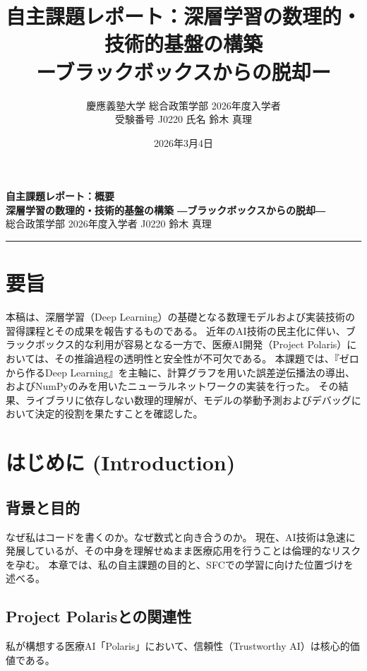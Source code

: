 \documentclass[uplatex, dvipdfmx, a4paper, 11pt]{jsarticle}
\title{自主課題レポート：深層学習の数理的・技術的基盤の構築\\ \large ーブラックボックスからの脱却ー}
\author{慶應義塾大学 総合政策学部 2026年度入学者\\ 受験番号 J0220 \quad 氏名 鈴木 真理}
\date{2026年3月4日}
\begin{document}
\begin{center}
    {\Large \textbf{自主課題レポート：概要}} \\[5mm]
    {\large \textbf{深層学習の数理的・技術的基盤の構築 ―ブラックボックスからの脱却―}} \\[5mm]
    {\large 総合政策学部 2026年度入学者 \quad J0220 \quad 鈴木 真理} \\[2mm]
    \rule{\textwidth}{0.4mm}
\end{center}

\thispagestyle{empty}

\section*{要旨}
本稿は、深層学習（Deep Learning）の基礎となる数理モデルおよび実装技術の習得課程とその成果を報告するものである。
近年のAI技術の民主化に伴い、ブラックボックス的な利用が容易となる一方で、医療AI開発（Project Polaris）においては、その推論過程の透明性と安全性が不可欠である。
本課題では、『ゼロから作るDeep Learning』を主軸に、計算グラフを用いた誤差逆伝播法の導出、およびNumPyのみを用いたニューラルネットワークの実装を行った。
その結果、ライブラリに依存しない数理的理解が、モデルの挙動予測およびデバッグにおいて決定的役割を果たすことを確認した。

\vfill
\clearpage

\setcounter{page}{1}

\section{はじめに (Introduction)}
\subsection{背景と目的}
なぜ私はコードを書くのか。なぜ数式と向き合うのか。
現在、AI技術は急速に発展しているが、その中身を理解せぬまま医療応用を行うことは倫理的なリスクを孕む。
本章では、私の自主課題の目的と、SFCでの学習に向けた位置づけを述べる。

\subsection{Project Polarisとの関連性}
私が構想する医療AI「Polaris」において、信頼性（Trustworthy AI）は核心的価値である。
\end{document}
